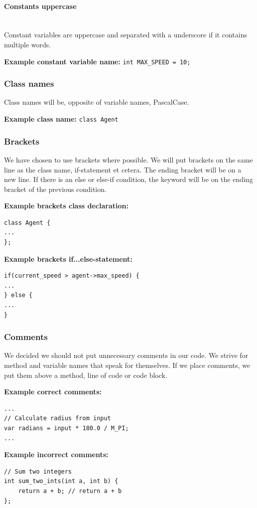 \paragraph{Constants uppercase}
~\\Constant variables are uppercase and separated with a underscore if it contains multiple words.

\textbf{Example constant variable name:} \lstinline{int MAX_SPEED = 10;}

\subsubsection{Class names}
Class names will be, opposite of variable names, PascalCase.

\textbf{Example class name:} \lstinline{class Agent}\clearpage

\subsubsection{Brackets}
We have chosen to use brackets where possible. We will put brackets on the same line as the class name, if-statement et cetera. The ending bracket will be on a new line.
If there is an else or else-if condition, the keyword will be on the ending bracket of the previous condition.

\textbf{Example brackets class declaration:}
\begin{lstlisting}
class Agent {
...
};
\end{lstlisting}

\textbf{Example brackets if...else-statement:}
\begin{lstlisting}
if(current_speed > agent->max_speed) {
...
} else {
... 
}
\end{lstlisting}

\subsubsection{Comments}
We decided we should not put unnecessary comments in our code. We strive for method and variable names that speak for themselves. If we place comments, we put them above a method, line of code or code block.

\textbf{Example correct comments:}
\begin{lstlisting}
...
// Calculate radius from input
var radians = input * 180.0 / M_PI;
...
\end{lstlisting}

\textbf{Example incorrect comments:}
\begin{lstlisting}
// Sum two integers
int sum_two_ints(int a, int b) {
	return a + b; // return a + b
};
\end{lstlisting}
